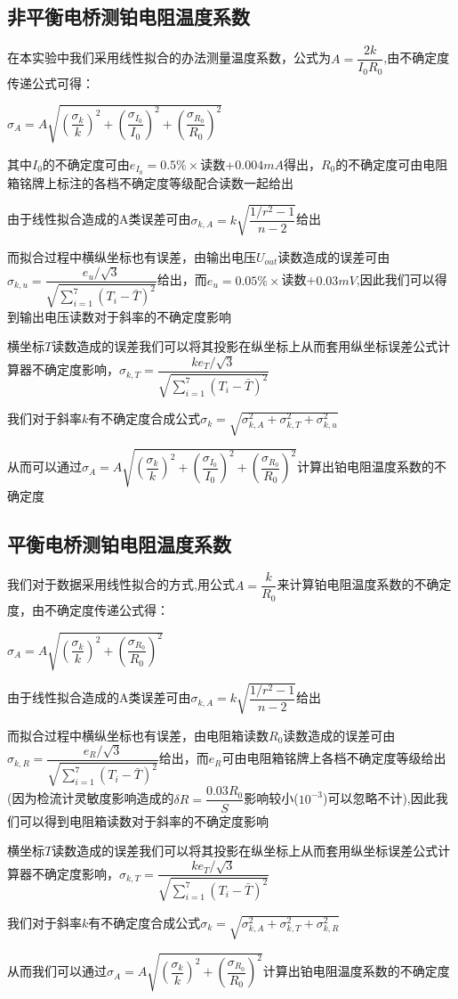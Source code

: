 \documentclass[a4 paper,12pt]{article}
\begin{document}
\subsection{非平衡电桥测铂电阻温度系数}
在本实验中我们采用线性拟合的办法测量温度系数，公式为$A=\dfrac{2k}{I_{0}R_{0}}$,由不确定度传递公式可得：
\begin{center}
	$\sigma_{A}=A\sqrt{(\dfrac{\sigma_{k}}{k})^{2}+(\dfrac{\sigma_{I_{0}}}{I_{0}})^{2}+(\dfrac{\sigma_{R_{0}}}{R_{0}})^{2}}$
\end{center}
\par 其中$I_{0}$的不确定度可由$e_{I_{0}}=0.5\%\times$读数+$0.004mA$得出，$R_{0}$的不确定度可由电阻箱铭牌上标注的各档不确定度等级配合读数一起给出
\par 由于线性拟合造成的A类误差可由$\sigma_{k,A}=k\sqrt{\dfrac{1/r^{2}-1}{n-2}}$给出
\par 而拟合过程中横纵坐标也有误差，由输出电压$U_{out}$读数造成的误差可由$\sigma_{k,u}=\dfrac{e_{u}/\sqrt{3}}{\sqrt{\sum\limits_{i=1}^{7}(T_{i}-\bar{T})^{2}}}$给出，而$e_{u}=0.05\%\times$读数+$0.03mV$,因此我们可以得到输出电压读数对于斜率的不确定度影响
\par 横坐标$T$读数造成的误差我们可以将其投影在纵坐标上从而套用纵坐标误差公式计算器不确定度影响，$\sigma_{k,T}=\dfrac{ke_{T}/\sqrt{3}}{\sqrt{\sum\limits_{i=1}^{7}(T_{i}-\bar{T})^{2}}}$
\par 我们对于斜率$k$有不确定度合成公式$\sigma_{k}=\sqrt{\sigma_{k,A}^{2}+\sigma_{k,T}^{2}+\sigma_{k,u}^{2}}$
\par 从而可以通过$\sigma_{A}=A\sqrt{(\dfrac{\sigma_{k}}{k})^{2}+(\dfrac{\sigma_{I_{0}}}{I_{0}})^{2}+(\dfrac{\sigma_{R_{0}}}{R_{0}})^{2}}$计算出铂电阻温度系数的不确定度
\subsection{平衡电桥测铂电阻温度系数}
我们对于数据采用线性拟合的方式,用公式$A=\dfrac{k}{R_{0}}$来计算铂电阻温度系数的不确定度，由不确定度传递公式得：
\begin{center}
	$\sigma_{A}=A\sqrt{(\dfrac{\sigma_{k}}{k})^{2}+(\dfrac{\sigma_{R_{0}}}{R_{0}})^{2}}$
\end{center}
\par 由于线性拟合造成的A类误差可由$\sigma_{k,A}=k\sqrt{\dfrac{1/r^{2}-1}{n-2}}$给出
\par 而拟合过程中横纵坐标也有误差，由电阻箱读数$R_{0}$读数造成的误差可由$\sigma_{k,R}=\dfrac{e_{R}/\sqrt{3}}{\sqrt{\sum\limits_{i=1}^{7}(T_{i}-\bar{T})^{2}}}$给出，而$e_{R}$可由电阻箱铭牌上各档不确定度等级给出(因为检流计灵敏度影响造成的$\delta R=\dfrac{0.03R_{0}}{S}$影响较小($10^{-3}$)可以忽略不计),因此我们可以得到电阻箱读数对于斜率的不确定度影响
\par 横坐标$T$读数造成的误差我们可以将其投影在纵坐标上从而套用纵坐标误差公式计算器不确定度影响，$\sigma_{k,T}=\dfrac{ke_{T}/\sqrt{3}}{\sqrt{\sum\limits_{i=1}^{7}(T_{i}-\bar{T})^{2}}}$
\par 我们对于斜率$k$有不确定度合成公式$\sigma_{k}=\sqrt{\sigma_{k,A}^{2}+\sigma_{k,T}^{2}+\sigma_{k,R}^{2}}$
\par 从而我们可以通过$\sigma_{A}=A\sqrt{(\dfrac{\sigma_{k}}{k})^{2}+(\dfrac{\sigma_{R_{0}}}{R_{0}})^{2}}$计算出铂电阻温度系数的不确定度
\end{document}
